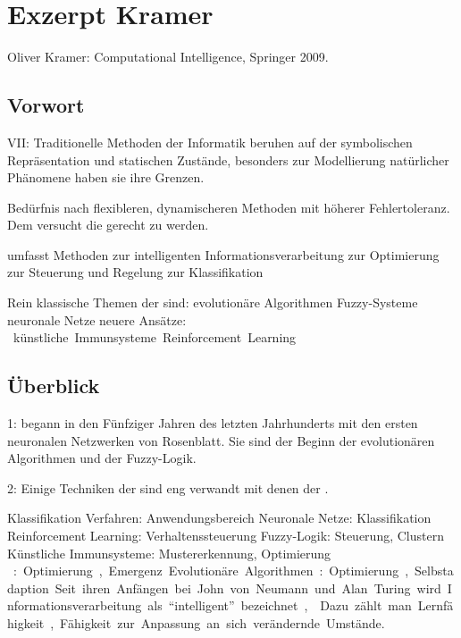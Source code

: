\chapter{Exzerpt Kramer}

Oliver Kramer: Computational Intelligence, Springer 2009.

\section{Vorwort} %

VII: Traditionelle Methoden der Informatik beruhen auf der
symbolischen Repräsentation und statischen Zustände,
besonders zur Modellierung natürlicher Phänomene haben sie
ihre Grenzen.

Bedürfnis nach flexibleren, dynamischeren Methoden mit
höherer Fehlertoleranz. Dem versucht die \CI{} gerecht zu
werden.

\CI{} umfasst Methoden zur
    intelligenten Informationsverarbeitung
    zur Optimierung
    zur Steuerung und Regelung
    zur Klassifikation

Rein klassische Themen der \CI{} sind:
    evolutionäre Algorithmen
    Fuzzy-Systeme
    neuronale Netze
neuere Ansätze:
    \SI{}
    künstliche Immunsysteme
    Reinforcement Learning

\section{Überblick \CI{}} %

1: \CI{} begann in den Fünfziger Jahren des letzten
Jahrhunderts mit den ersten neuronalen Netzwerken von
Rosenblatt. Sie sind der Beginn der evolutionären
Algorithmen und der Fuzzy-Logik.

2: Einige Techniken der \CI{} sind eng verwandt mit denen
der \AI{}. 

Klassifikation Verfahren: Anwendungsbereich
    Neuronale Netze: Klassifikation
    Reinforcement Learning: Verhaltenssteuerung
    Fuzzy-Logik: Steuerung, Clustern
    Künstliche Immunsysteme: Mustererkennung, Optimierung
    \SI{}: Optimierung, Emergenz
    Evolutionäre Algorithmen: Optimierung, Selbstadaption.

Seit ihren Anfängen bei John von Neumann und Alan Turing
wird Informationsverarbeitung als \enquote{intelligent}
bezeichnet, 
. Dazu zählt man Lernfähigkeit,
Fähigkeit zur Anpassung an sich verändernde Umstände.

